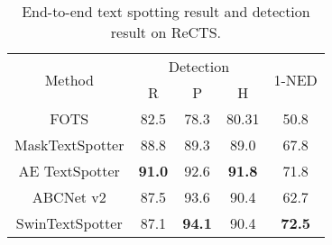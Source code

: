 \documentclass[10pt,twocolumn,letterpaper]{article}
\begin{document}
\begin{table}[t]
\centering
\begin{tabular}{c|c|c|c|c}
\hline
\multirow{2}{*}{Method} & \multicolumn{3}{c|}{Detection} & \multirow{2}{*}{1-NED} \\ \cline{2-4}
                        & R        & P        & H        &                        \\ \hline
FOTS\cite{liu2018fots}                    & 82.5     & 78.3     & 80.31    & 50.8                   \\ \hline
MaskTextSpotter\cite{liao2019mask}         & 88.8     & 89.3     & 89.0       & 67.8                   \\ \hline
AE TextSpotter\cite{wang2020ae}          & \textbf{91.0}     & 92.6     & \textbf{91.8}     & 71.8                   \\ \hline
ABCNet v2\cite{liu2021abcnetv2}               & 87.5     & 93.6     & 90.4     & 62.7                   \\ \hline
SwinTextSpotter                    & 87.1     & \textbf{94.1}     & 90.4     & \textbf{72.5}                   \\ \hline
\end{tabular}
\caption{End-to-end text spotting result and detection result on ReCTS.}
\label{ReCTS Rsult}
\end{table}

\begin{table*}[t!]
\centering
{}
\caption{End-to-end recognition result on RoIC13. P, R, H represent precision,
recall and Hmean, respectively.}
\label{Rotate-IC13-end-to-end}
\end{table*}
\end{document}

